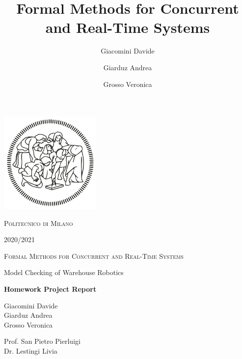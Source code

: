 \documentclass[12pt,oneside,a4paper]{article}
\title{Formal Methods for Concurrent and Real-Time Systems}
\author{Giacomini Davide \and Giarduz Andrea \and Grosso Veronica}
\begin{document}
\begin{titlepage}
\begin{center}
        \vspace*{-1,5cm}
		\includegraphics[width=5cm]{resources/logo.png}
		
        \LARGE{{\scshape Politecnico di Milano}}
        
        \LARGE{}
        
        \LARGE{2020/2021}
        
        \vspace*{1cm}
        \Large{{\scshape Formal Methods for Concurrent and Real-Time Systems}}
        
        \vspace*{1cm}
        \Huge{Model Checking of Warehouse Robotics}
 
 		\Large{\textbf{Homework Project Report}}
        \vfill
        
        \vspace*{0,8cm}
        \Large{Giacomini Davide\\
        Giarduz Andrea\\
        Grosso Veronica
        }
            
        \vspace{1,2cm}
           
        \Large
        Prof. San Pietro Pierluigi\\
        Dr. Lestingi Livia
    \end{center}
\end{titlepage}

\setcounter{tocdepth}{3}
\tableofcontents

\newpage

\listoffigures
{}
\listoftables
{}

\newpage
{}






\end{document}
